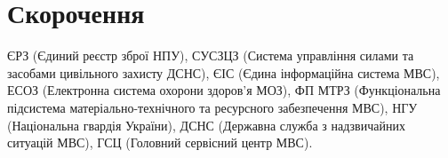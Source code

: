 \section*{Скорочення}

ЄРЗ (Єдиний реєстр зброї НПУ),
СУСЗЦЗ (Система управління силами та засобами цивільного захисту ДСНС),
ЄІС (Єдина інформаційна система МВС),
ЕСОЗ (Електронна система охорони здоров'я МОЗ),
ФП МТРЗ (Функціональна підсистема матеріально-технічного та ресурсного забезпечення МВС),
НГУ (Національна гвардія України),
ДСНС (Державна служба з надзвичайних ситуацій МВС),
ГСЦ (Головний сервісний центр МВС).
